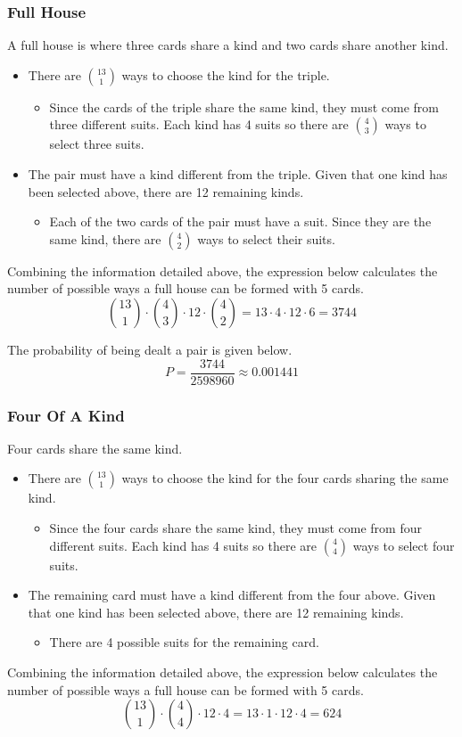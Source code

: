\subsubsection*{Full House}
A full house is where three cards share a kind and two cards share another kind.
\begin{itemize}
    \item There are $\binom{13}{1}$ ways to choose the  kind for the triple.
    \begin{itemize}
        \item Since the cards of the triple share the same kind, they must come from three different suits.  Each kind has 4 suits so there are $\binom{4}{3}$ ways to select three suits.
    \end{itemize}
    \item The pair must have a kind different from the triple.  Given that one kind has been selected above, there are 12 remaining kinds.  
    \begin{itemize}
        \item Each of the two cards of the pair must have a suit.  Since they are the same kind, there are $\binom{4}{2}$ ways to select their suits. 
    \end{itemize}    

\end{itemize}
Combining the information detailed above, the expression below calculates the number of possible ways a full house can be formed with 5 cards.
$$\binom{13}{1} \cdot \binom{4}{3} \cdot 12 \cdot \binom{4}{2} = 13 \cdot 4 \cdot 12 \cdot 6 = 3744$$

The probability of being dealt a pair is given below.
$$P = \frac{3744}{2598960} \approx 0.001441$$

\subsubsection*{Four Of A Kind}
Four cards share the same kind.
\begin{itemize}
    \item There are $\binom{13}{1}$ ways to choose the  kind for the four cards sharing the same kind.
    \begin{itemize}
        \item Since the four cards share the same kind, they must come from four different suits.  Each kind has 4 suits so there are $\binom{4}{4}$ ways to select four suits.
    \end{itemize}
    \item The remaining card must have a kind different from the four above.  Given that one kind has been selected above, there are 12 remaining kinds.  
    \begin{itemize}
        \item There are 4 possible suits for the remaining card. 
    \end{itemize}    

\end{itemize}
Combining the information detailed above, the expression below calculates the number of possible ways a full house can be formed with 5 cards.
$$\binom{13}{1} \cdot \binom{4}{4} \cdot 12 \cdot 4 = 13 \cdot 1 \cdot 12 \cdot 4 = 624$$

